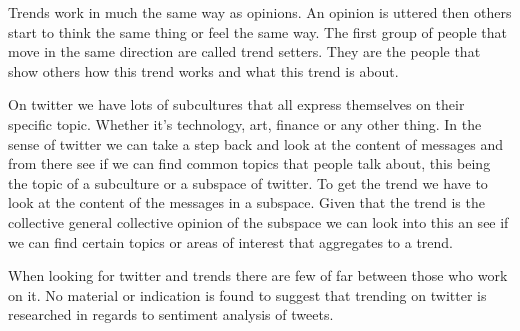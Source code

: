 Trends work in much the same way as opinions. An opinion is uttered then others start to think the same thing or
feel the same way. The first group of people that move in the same direction
are called trend setters. They are the people that show others how this trend works and
what this trend is about. 

On twitter we have lots of subcultures that all express themselves on their
specific topic. Whether it's technology, art, finance or any other thing.  
In the sense of twitter we can take a step back and look at the content of
messages and from there see if we can find common topics that people talk
about, this being the topic of a subculture or a subspace of twitter. To get
the trend we have to look at the content of the messages in a subspace. Given
that the trend is the collective general collective opinion of the subspace we
can look into this an see if we can find certain topics or areas of interest
that aggregates to a trend. 

When looking for twitter and trends there are few of far between those who work
on it. No material or indication is found to suggest that trending on twitter
is researched in regards to sentiment analysis of tweets.

